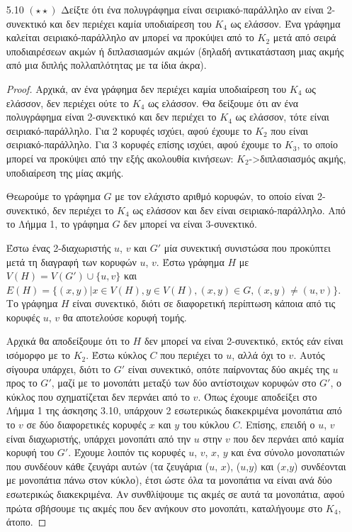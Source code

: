 \documentclass[a4paper, oneside, 11pt]{article}
\theoremstyle{definition}
\begin{document}
\begin{enumerate}
\begin{proof}
      \[ d(u_1)\cdot1 + d(u_2)\cdot2 + \ldots + d(u_n)\cdot1
         \leq (d^2(u_1) + \ldots + d^2(u_n)) \cdot (1 + \ldots + 1)
         = (d^2(u_1) + \ldots + d^2(u_n)) \cdot n \]

      \end{proof}

   \item[5.10 $(\star \star)$]
Δείξτε ότι ένα πολυγράφημα είναι σειριακό-παράλληλο αν είναι 2-συνεκτικό και δεν περιέχει καμία υποδιαίρεση του $K_4$ ως ελάσσον. Ένα γράφημα καλείται σειριακό-παράλληλο αν μπορεί
να προκύψει από το $K_2$ μετά από σειρά υποδιαιρέσεων ακμών ή διπλασιασμών ακμών (δηλαδή αντικατάσταση μιας ακμής από μια διπλής πολλαπλότητας με τα ίδια άκρα).
	\begin{proof}
Αρχικά, αν ένα γράφημα δεν περιέχει καμία υποδιαίρεση του $K_4$ ως ελάσσον, δεν περιέχει ούτε το $K_4$ ως ελάσσον.
Θα δείξουμε ότι αν ένα πολυγράφημα είναι 2-συνεκτικό και δεν περιέχει το $K_4$ ως ελάσσον, τότε είναι σειριακό-παράλληλο.
Για 2 κορυφές ισχύει, αφού έχουμε το $K_2$ που είναι σειριακό-παράλληλο.
Για 3 κορυφές επίσης ισχύει, αφού έχουμε το $K_3$, το οποίο μπορεί να προκύψει από την εξής ακολουθία κινήσεων: 
$K_2$->διπλασιασμός ακμής, υποδιαίρεση της μίας ακμής.

Θεωρούμε το γράφημα $G$ με τον ελάχιστο αριθμό κορυφών, το οποίο είναι 2-συνεκτικό, δεν περιέχει το $K_4$ ως ελάσσον και δεν είναι σειριακό-παράλληλο. Από το Λήμμα 1, το γράφημα $G$ δεν μπορεί
να είναι 3-συνεκτικό. 

Έστω ένας 2-διαχωριστής $u$, $v$ και $G'$ μία συνεκτική συνιστώσα που προκύπτει μετά τη διαγραφή των κορυφών $u$, $v$. Έστω γράφημα $H$ με 
$V(H)=V(G')\cup \{u,v\}$ και $E(H) = \{(x,y) | x\in V(H), y\in V(H), (x,y)\in G, (x,y)\neq (u,v)\}$. Το γράφημα $H$ είναι συνεκτικό, διότι σε διαφορετική περίπτωση κάποια από τις κορυφές 
$u$, $v$ θα αποτελούσε κορυφή τομής. 

Αρχικά θα αποδείξουμε ότι το $H$ δεν μπορεί να είναι 2-συνεκτικό, εκτός εάν είναι ισόμορφο με το $K_2$. Έστω κύκλος $C$ που περιέχει το $u$, αλλά όχι το $v$. Αυτός σίγουρα υπάρχει, διότι το 
$G'$ είναι συνεκτικό, οπότε παίρνοντας δύο ακμές της $u$ προς το $G'$, μαζί με το μονοπάτι μεταξύ των δύο αντίστοιχων κορυφών στο $G'$, ο κύκλος που σχηματίζεται δεν περνάει από το $v$. Όπως έχουμε
αποδείξει στο Λήμμα 1 της άσκησης 3.10, υπάρχουν 2 εσωτερικώς διακεκριμένα μονοπάτια από το $v$ σε δύο διαφορετικές κορυφές $x$ και $y$ του κύκλου $C$. Επίσης, επειδή ο $u$, $v$ είναι διαχωριστής, 
υπάρχει μονοπάτι
από την $u$ στην $v$ που δεν περνάει από καμία κορυφή του $G'$. Έχουμε λοιπόν τις κορυφές $u$, $v$, $x$, $y$ και ένα σύνολο μονοπατιών που συνδέουν κάθε ζευγάρι αυτών (τα ζευγάρια ($u$, $x$),
($u$,$y$) και ($x$,$y$) συνδέονται με μονοπάτια πάνω στον κύκλο), έτσι ώστε όλα τα μονοπάτια να
είναι ανά δύο εσωτερικώς διακεκριμένα. Αν συνθλίψουμε τις ακμές σε αυτά τα μονοπάτια, αφού πρώτα σβήσουμε τις ακμές που δεν ανήκουν στο μονοπάτι, καταλήγουμε στο $K_4$, άτοπο.


\end{proof}
\end{enumerate}
\end{document}
